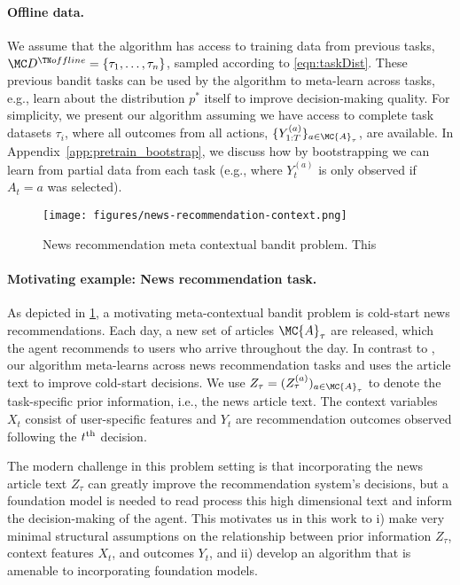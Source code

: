 \paragraph{Offline data.}
We assume that the algorithm has access to training data from previous tasks, $\Dtrain = \{ \tau_1, \dots, \tau_n \}$, sampled according to \eqref{eqn:taskDist}. These previous bandit tasks can be used by the algorithm to meta-learn across tasks, e.g., learn about the distribution $p^*$ itself to improve decision-making quality. For simplicity, we present our algorithm assuming we have access to complete task datasets $\tau_i$, where all outcomes from all actions, $\{ Y_{1:T}^{(a)} \}_{a \in \MC{A}_{\tau}}$, are available. In Appendix~\ref{app:pretrain_bootstrap}, we discuss how by bootstrapping we can learn from partial data from each task (e.g., where $Y_t^{(a)}$ is only observed if $A_t = a$ was selected).

\begin{figure}[t]
    \centering
    \texttt{[image: figures/news-recommendation-context.png]}
    \caption{News recommendation meta contextual bandit problem. This }
    \label{fig:news-recommendation}
\end{figure}

\paragraph{Motivating example: News recommendation task.}
As depicted in \ref{fig:news-recommendation}, a motivating meta-contextual bandit problem is cold-start news recommendations.
Each day, a new set of articles $\MC{A}_{\tau}$ are released, which the agent recommends to users who arrive throughout the day. In contrast to \citet{li2010contextual}, our algorithm meta-learns across news recommendation tasks and uses the article text to improve cold-start decisions. We use $Z_{\tau} = (Z_{\tau}^{(a)})_{a \in \MC{A}_{\tau}}$ to denote the task-specific prior information, i.e., the news article text. The context variables $X_t$ consist of user-specific features and $Y_t$ are recommendation outcomes observed following the $t^{\rm{th}}$ decision. 

The modern challenge in this problem setting is that incorporating the news article text $Z_{\tau}$ can greatly improve the recommendation system's decisions, but a foundation model is needed to read process this high dimensional text and inform the decision-making of the agent. This motivates us in this work to i) make very minimal structural assumptions on the relationship between prior information $Z_{\tau}$, context features $X_t$, and outcomes $Y_t$, and ii) develop an algorithm that is amenable to incorporating foundation models. 


